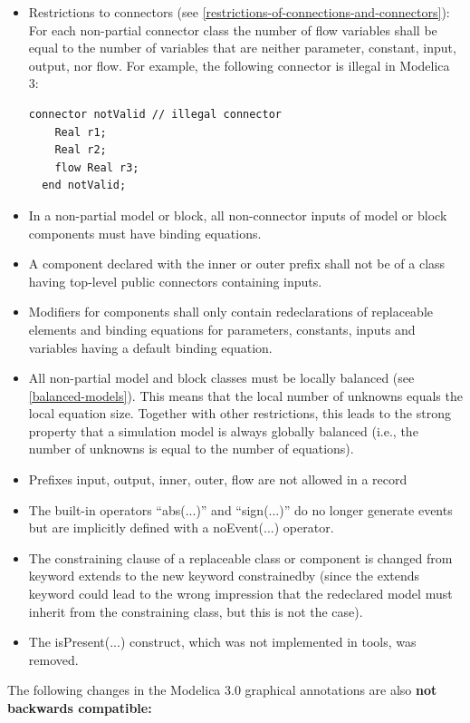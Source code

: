 \documentclass[10pt,a4paper]{report}
\begin{document}
\begin{itemize}
\item
  Restrictions to connectors (see \ref{restrictions-of-connections-and-connectors}): For each non-partial
  connector class the number of flow variables shall be equal to the
  number of variables that are neither parameter, constant, input,
  output, nor flow. For example, the following connector is illegal in
  Modelica 3:\\
  \begin{lstlisting}[language=modelica]
  connector notValid // illegal connector
    Real r1;
    Real r2;
    flow Real r3;
  end notValid;
  \end{lstlisting}
\item
  In a non-partial model or block, all non-connector inputs of model or
  block components must have binding equations.
\item
  A component declared with the inner or outer prefix shall not be of a
  class having top-level public connectors containing inputs.
\item
  Modifiers for components shall only contain redeclarations of
  replaceable elements and binding equations for parameters, constants,
  inputs and variables having a default binding equation.
\item
  All non-partial model and block classes must be locally balanced (see
  \ref{balanced-models}). This means that the local number of unknowns equals the
  local equation size. Together with other restrictions, this leads to
  the strong property that a simulation model is always globally
  balanced (i.e., the number of unknowns is equal to the number of
  equations).
\item
  Prefixes input, output, inner, outer, flow are not allowed in a record
\item
  The built-in operators ``abs(...)'' and ``sign(...)'' do no longer
  generate events but are implicitly defined with a noEvent(...)
  operator.
\item
  The constraining clause of a replaceable class or component is changed
  from keyword extends to the new keyword constrainedby (since the
  extends keyword could lead to the wrong impression that the redeclared
  model must inherit from the constraining class, but this is not the
  case).
\item
  The isPresent(...) construct, which was not implemented in tools, was
  removed.
\end{itemize}

The following changes in the Modelica 3.0 graphical annotations are also
\textbf{not backwards compatible:}
\end{document}

